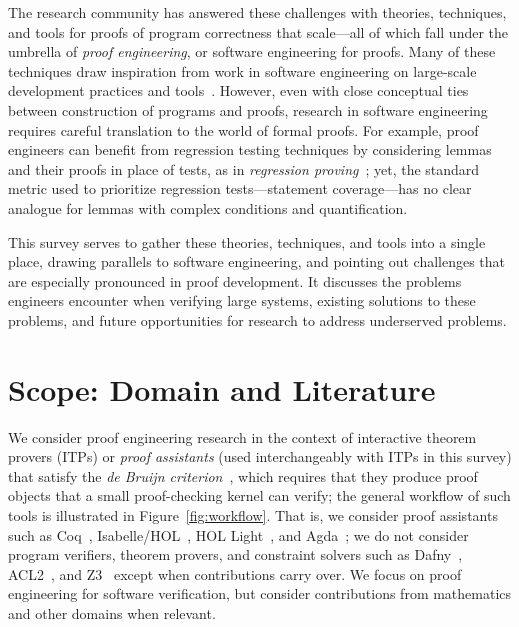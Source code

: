 The research community has answered these challenges with theories, techniques, and tools
for proofs of program correctness that scale---all of which fall under the umbrella of \textit{proof engineering},
or software engineering for proofs. 
Many of these techniques draw inspiration from work in software engineering on large-scale development practices and tools~\citep{Klein2014}. 
However, even with close conceptual ties between construction of programs and proofs, research in software engineering requires careful translation to the world of formal proofs. For example, proof engineers can benefit from regression testing techniques by considering lemmas and their proofs in place of tests, as in \textit{regression proving}~\citep{Celik2017}; yet, the standard metric used to prioritize regression tests---statement coverage---has no clear analogue for lemmas with complex conditions and quantification.

This survey serves to gather these theories, techniques, and tools into a single place,
drawing parallels to software engineering, and pointing out challenges that are especially
pronounced in proof development.
It discusses the problems engineers encounter when verifying large systems, 
existing solutions to these problems, and future opportunities for research to address underserved problems.

\section{Scope: Domain and Literature}

We consider proof engineering research in the context of interactive theorem provers (ITPs) or \textit{proof assistants} (used interchangeably with ITPs in this survey) that satisfy the \textit{de Bruijn criterion}~\citep{Barendregt2002,Barendregt2351}, which requires that they produce proof objects that a small proof-checking kernel can verify; the general workflow of such tools is illustrated in Figure~\ref{fig:workflow}. That is, we consider proof assistants such as Coq~\citep{coq}, Isabelle/HOL~\citep{isabelle}, 
HOL Light~\citep{hollight}, and Agda~\citep{agda}; we do not consider program verifiers, theorem provers, and constraint solvers such as Dafny~\citep{Leino2010}, ACL2~\citep{acl2}, and Z3~\citep{z3}
except when contributions carry over. We focus on proof engineering for software verification, 
but consider contributions from mathematics and other domains when relevant.

